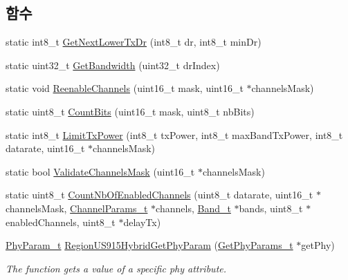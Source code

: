 \subsection*{함수}
\begin{DoxyCompactItemize}
\item 
static int8\+\_\+t \mbox{\hyperlink{_region_u_s915-_hybrid_8c_ae06574681e2f7c3f3e604878c81743aa}{Get\+Next\+Lower\+Tx\+Dr}} (int8\+\_\+t dr, int8\+\_\+t min\+Dr)
\item 
static uint32\+\_\+t \mbox{\hyperlink{_region_u_s915-_hybrid_8c_afbe81e6d36760141722791d216d4ac60}{Get\+Bandwidth}} (uint32\+\_\+t dr\+Index)
\item 
static void \mbox{\hyperlink{_region_u_s915-_hybrid_8c_ac8aa2da46dca1566e730ffda2650f947}{Reenable\+Channels}} (uint16\+\_\+t mask, uint16\+\_\+t $\ast$channels\+Mask)
\item 
static uint8\+\_\+t \mbox{\hyperlink{_region_u_s915-_hybrid_8c_a8628e96fecf706f9925739e9c91535e7}{Count\+Bits}} (uint16\+\_\+t mask, uint8\+\_\+t nb\+Bits)
\item 
static int8\+\_\+t \mbox{\hyperlink{_region_u_s915-_hybrid_8c_af2821991c6e6dad3e196b01f6cf1d542}{Limit\+Tx\+Power}} (int8\+\_\+t tx\+Power, int8\+\_\+t max\+Band\+Tx\+Power, int8\+\_\+t datarate, uint16\+\_\+t $\ast$channels\+Mask)
\item 
static bool \mbox{\hyperlink{_region_u_s915-_hybrid_8c_a15a15fb81475f8a2ff4c6c5a60aa291d}{Validate\+Channels\+Mask}} (uint16\+\_\+t $\ast$channels\+Mask)
\item 
static uint8\+\_\+t \mbox{\hyperlink{_region_u_s915-_hybrid_8c_a43fc7f3f4d15301eebe5c4a8b64b3f51}{Count\+Nb\+Of\+Enabled\+Channels}} (uint8\+\_\+t datarate, uint16\+\_\+t $\ast$channels\+Mask, \mbox{\hyperlink{group___l_o_r_a_m_a_c_ga1360ca6f82c6d125ea43a9dad9b56184}{Channel\+Params\+\_\+t}} $\ast$channels, \mbox{\hyperlink{group___l_o_r_a_m_a_c_ga8f49721ee96ceb52c80a896ab11a2ed8}{Band\+\_\+t}} $\ast$bands, uint8\+\_\+t $\ast$enabled\+Channels, uint8\+\_\+t $\ast$delay\+Tx)
\item 
\mbox{\hyperlink{group___r_e_g_i_o_n_gaed159b26e5c4677236b6e8677019db30}{Phy\+Param\+\_\+t}} \mbox{\hyperlink{group___r_e_g_i_o_n_u_s915_h_y_b_gaf078bd0d293c1a677ca53b7b6ca96c6e}{Region\+U\+S915\+Hybrid\+Get\+Phy\+Param}} (\mbox{\hyperlink{group___r_e_g_i_o_n_gab471483fff904f4f89bbc03f7fc380ab}{Get\+Phy\+Params\+\_\+t}} $\ast$get\+Phy)
\begin{DoxyCompactList}\small\item\em The function gets a value of a specific phy attribute. \end{DoxyCompactList}\item 

\end{DoxyCompactItemize}
